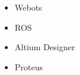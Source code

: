 \documentclass[10pt,a4paper,sans]{moderncv} %
\begin{document}
\begin{cvcolumns}
{\begin{itemize}[nosep]
\begin{itemize}[nosep]
					    \item Control System Toolbox
					    \item Robotics System Toolbox
					    \item ROS Toolbox
					    \item Simscape
					    \item Simulink 3D Animation
					\end{itemize}
					\item Webots
					\item ROS
				\end{itemize}
		}
		{
			\vspace{-0.5em}
				\begin{itemize}[nosep]
					\item Altium Designer
					\item Proteus
				\end{itemize}
		}
	\end{cvcolumns} 
	
	\vspace{-1em}
	
\end{document}
